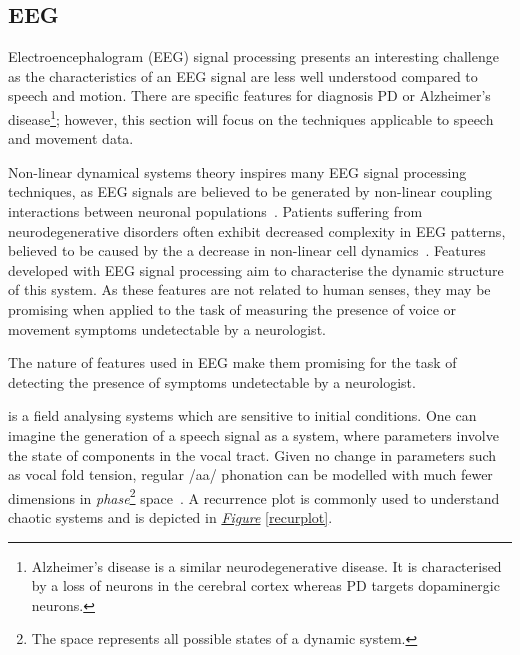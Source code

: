 \documentclass[12pt, twoside]{book}
\renewcommand\emph[1]{\textit{\color{USred}{#1}}}
\begin{document}
\subsection{EEG}
\label{eegsigproc}
Electroencephalogram (EEG) signal processing presents an interesting challenge as the characteristics of an EEG signal are less well understood compared to speech and motion. There are specific features for diagnosis PD or Alzheimer's disease\footnote{Alzheimer's disease is a similar neurodegenerative disease. It is characterised by a loss of neurons in the cerebral cortex whereas PD targets dopaminergic neurons.}; however, this section will focus on the techniques applicable to speech and movement data.

Non-linear dynamical systems theory inspires many EEG signal processing techniques, as EEG signals are believed to be generated by non-linear coupling interactions between neuronal populations~\cite{eegalzheimers}. Patients suffering from neurodegenerative disorders often exhibit decreased complexity in EEG patterns, believed to be caused by the a decrease in  non-linear cell dynamics~\cite{jelles1999decrease}. Features developed with EEG signal processing aim to characterise the dynamic structure of this system. As these features are not related to human senses, they may be promising when applied to the task of measuring the presence of voice or movement symptoms undetectable by a neurologist. 

\begin{highlight}
The nature of features used in EEG make them promising for the task of detecting the presence of symptoms undetectable by a neurologist.
\end{highlight}


\emph{Chaos theory} is a field analysing systems which are sensitive to initial conditions. One can imagine the generation of a speech signal as a system, where parameters involve the state of components in the vocal tract. Given no change in parameters such as vocal fold tension, regular /aa/ phonation can be modelled with much fewer dimensions in \textit{phase}\footnote{The \emph{phase} space represents all possible states of a dynamic system.} space~\cite{denoisingchaos, vocalchoas}. A recurrence plot is commonly used to understand chaotic systems and is depicted in \textit{\hyperref[recurplot]{Figure}} \ref{recurplot}.
\end{document}
